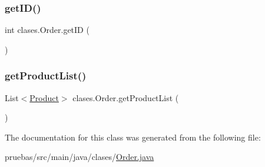 \subsubsection{\texorpdfstring{get\+I\+D()}{getID()}}
{\footnotesize\ttfamily int clases.\+Order.\+get\+ID (\begin{DoxyParamCaption}{ }\end{DoxyParamCaption})}

\mbox{\label{classclases_1_1_order_aa9c192ec7bdf6b49ac0ab309f1581d97}} 
\subsubsection{\texorpdfstring{get\+Product\+List()}{getProductList()}}
{\footnotesize\ttfamily List$<$\mbox{\hyperlink{classclases_1_1_product}{Product}}$>$ clases.\+Order.\+get\+Product\+List (\begin{DoxyParamCaption}{ }\end{DoxyParamCaption})}



The documentation for this class was generated from the following file\+:\begin{DoxyCompactItemize}
\item 
pruebas/src/main/java/clases/\mbox{\hyperlink{_order_8java}{Order.\+java}}\end{DoxyCompactItemize}
